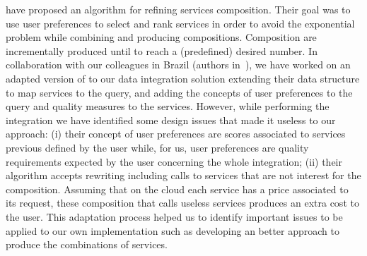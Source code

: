 \cite{ba2014} have proposed an algorithm for refining services composition. Their goal was to use user preferences to select and rank services in order to avoid the exponential problem while combining and producing compositions. Composition are incrementally produced until to reach a (predefined) desired number. In collaboration with our colleagues in Brazil (authors in~\cite{ba2014}), we have worked on an adapted version of \cite{ba2014} to our data integration solution extending their data structure to map services to the query, and adding the concepts of user preferences to the query and quality measures to the services. However, while performing the integration we have identified some design issues that made it useless to our approach: (i) their concept of user preferences are scores associated to services previous defined by the user while, for us, user preferences are quality requirements expected by the user concerning the whole integration; (ii) their algorithm accepts rewriting including calls to services that are not interest for the composition. Assuming that on the cloud each service has a price associated to its request, these composition that calls useless services produces an extra cost to the user. This adaptation process helped us to identify important issues to be applied to our own implementation such as developing an better approach to produce the combinations of services.



